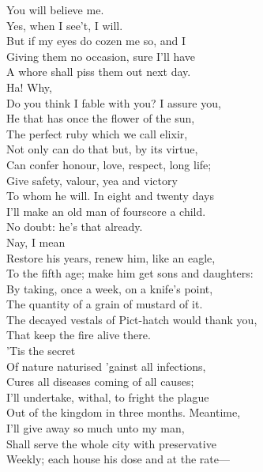 \documentclass[a4paper,oneside,12pt]{memoir}
\begin{document}
\begin{drama*}
You will believe me.\\
\surlyspeaks {} Yes, when I see't, I will.\\
But if my eyes do cozen me so, and I\\
Giving them no occasion, sure I'll have\\
A whore shall piss them out next day.\\
\mammonspeaks {} Ha! Why,\\
Do you think I fable with you? I assure you,\\
He that has once the flower of the sun,\\
The perfect ruby which we call elixir,\\
Not only can do that but, by its virtue,\\
Can confer honour, love, respect, long life;\\
Give safety, valour, yea and victory\\
To whom he will. In eight and twenty days\\
I'll make an old man of fourscore a child.\\
\surlyspeaks No doubt: he's that already.\\
\mammonspeaks {} Nay, I mean\\
Restore his years, renew him, like an eagle,\\
To the fifth age; make him get sons and daughters:\\
By taking, once a week, on a knife's point,\\
The quantity of a grain of mustard of it.\\
\surlyspeaks The decayed vestals of Pict-hatch would thank you,\\
That keep the fire alive there.\\
\mammonspeaks {} 'Tis the secret\\
Of nature naturised 'gainst all infections,\\
Cures all diseases coming of all causes;\\
I'll undertake, withal, to fright the plague\\
Out of the kingdom in three months. Meantime,\\
I'll give away so much unto my man,\\
Shall serve the whole city with preservative\\
Weekly; each house his dose and at the rate---\\

\end{drama*}
\end{document}
